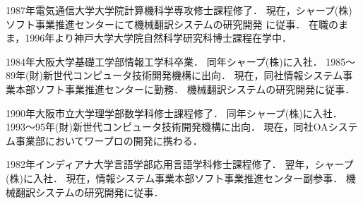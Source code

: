 


\begin{biography}
{1987年電気通信大学大学院計算機科学専攻修士課程修了．
現在，シャープ(株)ソフト事業推進センターにて機械翻訳システムの研究開発
に従事．
在職のまま，1996年より神戸大学大学院自然科学研究科博士課程在学中．}

{1984年大阪大学基礎工学部情報工学科卒業．
同年シャープ(株)に入社．
1985〜89年(財)新世代コンピュータ技術開発機構に出向．
現在，同社情報システム事業本部ソフト事業推進センターに勤務．
機械翻訳システムの研究開発に従事．}

{1990年大阪市立大学理学部数学科修士課程修了．
同年シャープ(株)に入社．
1993〜95年(財)新世代コンピュータ技術開発機構に出向．
現在，同社OAシステム事業部においてワープロの開発に携わる．}

{1982年インディアナ大学言語学部応用言語学科修士課程修了．
翌年，シャープ(株)に入社．
現在，情報システム事業本部ソフト事業推進センター副参事．
機械翻訳システムの研究開発に従事．}


\end{biography}




